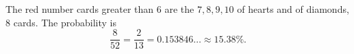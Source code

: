 The red number cards greater than $6$ are the $7,8,9,10$ of hearts and of diamonds, $8$ cards. The probability is
\[
\dfrac{8}{52}=\dfrac{2}{13}=0.153846\ldots\approx\boxed{15.38\%}.
\]
